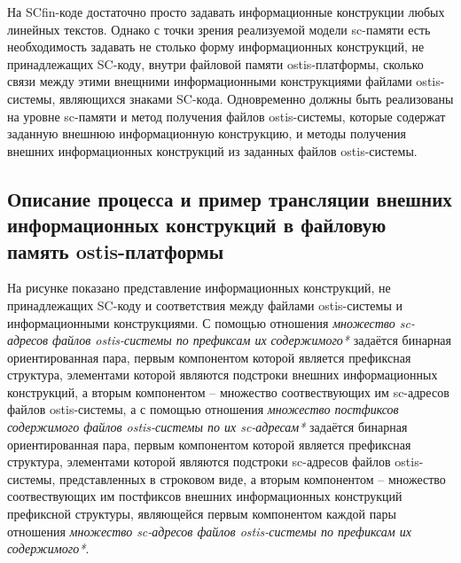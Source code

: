 На SCfin-коде достаточно просто задавать информационные конструкции любых линейных текстов. Однако с точки зрения реализуемой модели sc-памяти есть необходимость задавать не столько форму информационных конструкций, не принадлежащих SC-коду, внутри файловой памяти ostis-платформы, сколько связи между этими внещними информационными конструкциями файлами ostis-системы, являющихся знаками SC-кода. Одновременно должны быть реализованы на уровне sc-памяти и метод получения файлов ostis-системы, которые содержат заданную внешнюю информационную конструкцию, и методы получения внешних информационных конструкций из заданных файлов ostis-системы.

\subsection{Описание процесса и пример трансляции внешних информационных конструкций в файловую память ostis-платформы}
\label{sec_soft_platform_scfin_code_example}

На рисунке  показано представление информационных конструкций, не принадлежащих SC-коду и соответствия между файлами ostis-системы и информационными конструкциями. С помощью отношения \textit{множество sc-адресов файлов ostis-системы по префиксам их содержимого*} задаётся бинарная ориентированная пара, первым компонентом которой является префиксная структура, элементами которой являются подстроки внешних информационных конструкций, а вторым компонентом -- множество соотвествующих им sc-адресов файлов ostis-системы, а с помощью отношения \textit{множество постфиксов содержимого файлов ostis-системы по их sc-адресам*} задаётся бинарная ориентированная пара, первым компонентом которой является префиксная структура, элементами которой являются подстроки sc-адресов файлов ostis-системы, представленных в строковом виде, а вторым компонентом -- множество соотвествующих им постфиксов внешних информационных конструкций префиксной структуры, являющейся первым компонентом каждой пары отношения \textit{множество sc-адресов файлов ostis-системы по префиксам их содержимого*}.

